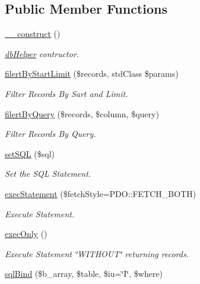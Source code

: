 \subsection*{\-Public \-Member \-Functions}
\begin{DoxyCompactItemize}
\item 
\hyperlink{classdb_helper_a095c5d389db211932136b53f25f39685}{\-\_\-\-\_\-construct} ()
\begin{DoxyCompactList}\small\item\em \hyperlink{classdb_helper}{db\-Helper} contructor. \end{DoxyCompactList}\item 
\hyperlink{classdb_helper_a3ca2578f15860418ca93fca0112a0e08}{filert\-By\-Start\-Limit} (\$records, std\-Class \$params)
\begin{DoxyCompactList}\small\item\em \-Filter \-Records \-By \-Sart and \-Limit. \end{DoxyCompactList}\item 
\hyperlink{classdb_helper_a39e97f07bde6edc04b653a4a93bed758}{filert\-By\-Query} (\$records, \$column, \$query)
\begin{DoxyCompactList}\small\item\em \-Filter \-Records \-By \-Query. \end{DoxyCompactList}\item 
\hyperlink{classdb_helper_a21e387f778abae898a33b0355e56c095}{set\-S\-Q\-L} (\$sql)
\begin{DoxyCompactList}\small\item\em \-Set the \-S\-Q\-L \-Statement. \end{DoxyCompactList}\item 
\hyperlink{classdb_helper_a43a2fa1fe095e37df5a641fe1cfc7d9c}{exec\-Statement} (\$fetch\-Style=\-P\-D\-O\-::\-F\-E\-T\-C\-H\-\_\-\-B\-O\-T\-H)
\begin{DoxyCompactList}\small\item\em \-Execute \-Statement. \end{DoxyCompactList}\item 
\hyperlink{classdb_helper_ae033db35138ae80f3b1fd33c5c2c473e}{exec\-Only} ()
\begin{DoxyCompactList}\small\item\em \-Execute \-Statement \char`\"{}\-W\-I\-T\-H\-O\-U\-T\char`\"{} returning records. \end{DoxyCompactList}\item 
\hyperlink{classdb_helper_aa9840bbfb81d2d519994cd0a8e880c4a}{sql\-Bind} (\$b\-\_\-array, \$table, \$iu=\char`\"{}\-I\char`\"{}, \$where)

\end{DoxyCompactItemize}
